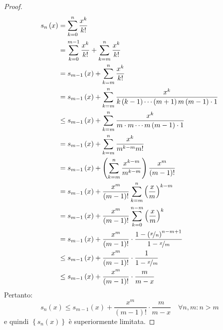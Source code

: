 \begin{proof}
  \begin{align*}
    s_n\left( x \right) & =\sum_{k=0}^n\frac{x^k}{k!}                                                                                                      \\
                        & =\sum_{k=0}^{m-1}\frac{x^k}{k!}+\sum_{k=m}^n\frac{x^k}{k!}                                                                       \\
                        & =s_{m-1}\left( x \right)+\sum_{k=m}^n\frac{x^k}{k!}                                                                              \\
                        & =s_{m-1}\left( x \right)+\sum_{k=m}^n\frac{x^k}{k\left( k-1 \right)\cdots\left( m+1 \right)m\left( m-1 \right)\cdot 1}           \\
                        & \le s_{m-1}\left( x \right)+\sum_{k=m}^n\frac{x^k}{m\cdot m\cdots m\left( m-1 \right)\cdot 1}                                    \\
                        & =s_{m-1}\left( x \right)+\sum_{k=m}^n\frac{x^k}{m^{k-m} m!}                                                                      \\
                        & =s_{m-1}\left( x \right)+\left( \sum_{k=m}^n\frac{x^{k-m}}{m^{k-m}} \right)\frac{x^m}{\left( m-1 \right)!}                       \\
                        & =s_{m-1}\left( x \right)+\frac{x^m}{\left( m-1 \right)!}\sum_{k=m}^n\left( \frac{x}{m} \right)^{k-m}                             \\
                        & =s_{m-1}\left( x \right)+\frac{x^m}{\left( m-1 \right)!}\sum_{k=0}^{n-m}\left( \frac{x}{m} \right)^{k}                           \\
                        & =s_{m-1}\left( x \right)+\frac{x^m}{\left( m-1 \right)!}\cdot \frac{1-\left( \nicefrac{x}{n} \right)^{n-m+1}}{1-\nicefrac{x}{m}} \\
                        & \le s_{m-1}\left( x \right)+\frac{x^m}{\left( m-1 \right)!}\cdot \frac{1}{1-\nicefrac{x}{m}}                                     \\
                        & \le s_{m-1}\left( x \right)+\frac{x^m}{\left( m-1 \right)!}\cdot \frac{m}{m-x}                                                   
  \end{align*}
  Pertanto:
  $$s_n\left( x \right)\le s_{m-1}\left( x \right)+\frac{x^m}{\left( m-1 \right)!}\cdot \frac{m}{m-x}\quad \forall n,m:n>m$$
  e quindi $\left\{ s_n\left( x \right) \right\}$ è superiormente limitata.
\end{proof}

